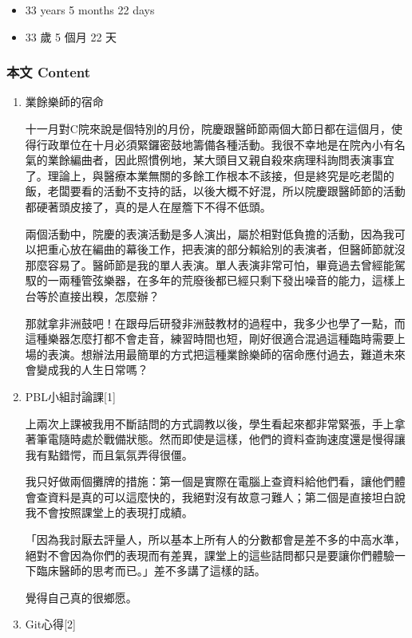 \documentclass[a5paper, 12pt
]{book}
\providecommand{\tightlist}{%
  \setlength{\itemsep}{0pt}\setlength{\parskip}{0pt}}
\begin{document}
\begin{itemize}
\tightlist
\item
  33 years 5 months 22 days
\item
  33 歲 5 個月 22 天
\end{itemize}

\hypertarget{ux672cux6587-content-16}{%
\subsubsection{本文 Content}\label{ux672cux6587-content-16}}

\begin{enumerate}
\def\labelenumi{\arabic{enumi}.}
\item
  業餘樂師的宿命

  十一月對C院來說是個特別的月份，院慶跟醫師節兩個大節日都在這個月，使得行政單位在十月必須緊鑼密鼓地籌備各種活動。我很不幸地是在院內小有名氣的業餘編曲者，因此照慣例地，某大頭目又親自殺來病理科詢問表演事宜了。理論上，與醫療本業無關的多餘工作根本不該接，但是終究是吃老闆的飯，老闆要看的活動不支持的話，以後大概不好混，所以院慶跟醫師節的活動都硬著頭皮接了，真的是人在屋簷下不得不低頭。

  兩個活動中，院慶的表演活動是多人演出，屬於相對低負擔的活動，因為我可以把重心放在編曲的幕後工作，把表演的部分賴給別的表演者，但醫師節就沒那麼容易了。醫師節是我的單人表演。單人表演非常可怕，畢竟過去曾經能駕馭的一兩種管弦樂器，在多年的荒廢後都已經只剩下發出噪音的能力，這樣上台等於直接出糗，怎麼辦？

  那就拿非洲鼓吧！在跟母后研發非洲鼓教材的過程中，我多少也學了一點，而這種樂器怎麼打都不會走音，練習時間也短，剛好很適合混過這種臨時需要上場的表演。想辦法用最簡單的方式把這種業餘樂師的宿命應付過去，難道未來會變成我的人生日常嗎？
\item
  PBL小組討論課{[}1{]}

  上兩次上課被我用不斷詰問的方式調教以後，學生看起來都非常緊張，手上拿著筆電隨時處於戰備狀態。然而即使是這樣，他們的資料查詢速度還是慢得讓我有點錯愕，而且氣氛弄得很僵。

  我只好做兩個攤牌的措施：第一個是實際在電腦上查資料給他們看，讓他們體會查資料是真的可以這麼快的，我絕對沒有故意刁難人；第二個是直接坦白說我不會按照課堂上的表現打成績。

  「因為我討厭去評量人，所以基本上所有人的分數都會是差不多的中高水準，絕對不會因為你們的表現而有差異，課堂上的這些詰問都只是要讓你們體驗一下臨床醫師的思考而已。」差不多講了這樣的話。

  覺得自己真的很鄉愿。
\item
  Git心得{[}2{]}


\end{enumerate}
\end{document}
